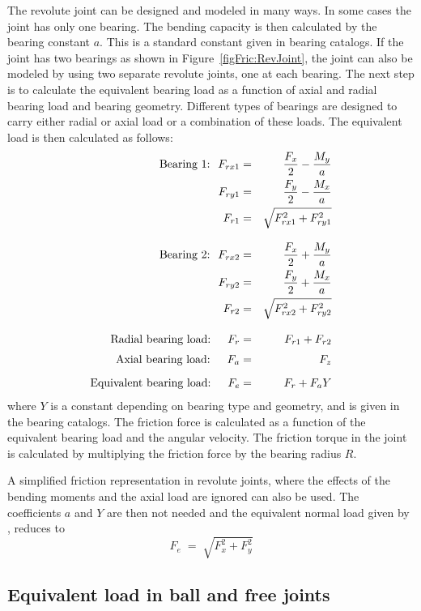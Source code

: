 The revolute joint can be designed and modeled in many ways.
In some cases the joint has only one bearing.
The bending capacity is then calculated by the bearing constant $a$.
This is a standard constant given in bearing catalogs.
If the joint has two bearings as shown in Figure~\ref{figFric:RevJoint},
the joint can also be modeled by using two separate revolute joints,
one at each bearing.
The next step is to calculate the equivalent bearing load as a function of axial
and radial bearing load and bearing geometry. Different types of bearings are
designed to carry either radial or axial load or a combination of these loads.
The equivalent load is then calculated as follows:
%
\begin{eqnarray}
\text{Bearing 1:}\hskip7pt
F_{rx1} &=& \frac{F_x}{2} - \frac{M_y}{a} \nonumber\\
F_{ry1} &=& \frac{F_y}{2} - \frac{M_x}{a} \nonumber\\
F_{r1}  &=& \sqrt{F_{rx1}^2 + F_{ry1}^2} \\[3mm]
%
\text{Bearing 2:}\hskip7pt
F_{rx2} &=& \frac{F_x}{2} + \frac{M_y}{a} \nonumber\\
F_{ry2} &=& \frac{F_y}{2} + \frac{M_x}{a} \nonumber\\
F_{r2}  &=& \sqrt{F_{rx2}^2 + F_{ry2}^2} \\[3mm]
%
\text{Radial bearing load:}\hskip15pt
F_r &=& F_{r1} + F_{r2} \\[1mm]
\text{Axial bearing load:}\hskip15pt
F_a &=& F_z \\[2mm]
%
\text{Equivalent bearing load:}\hskip15pt
\label{eq:BearingLoad}
F_e &=& F_r + F_a Y
\end{eqnarray}
%
where $Y$ is a constant depending on bearing type and geometry, and is
given in the bearing catalogs.
The friction force is calculated as a function of the equivalent bearing load
and the angular velocity. The friction torque in the joint is calculated by
multiplying the friction force by the bearing radius $R$.

A simplified friction representation in revolute joints, where the effects of
the bending moments and the axial load are ignored can also be used.
The coefficients $a$ and $Y$ are then not needed and the equivalent normal
load given by , reduces to
%
\begin{equation}
\label{eq:RevJointLoad}
F_e \;=\; \sqrt{F_x^2 + F_y^2}
\end{equation}


\subsection{Equivalent load in ball and free joints}


